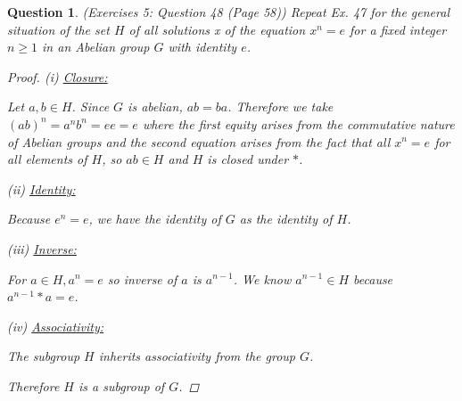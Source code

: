 \documentclass{article}
\newtheorem{ques}{Question}
\begin{document}
\begin{ques} (Exercises 5: Question 48 (Page 58))
	Repeat Ex. 47 for the general situation of the set $H$ of all solutions x of the equation $x^n = e$ for a fixed integer $n \geq 1$ in an Abelian group $G$ with identity $e$. 
	
	\begin{proof}
		(i) \underline{Closure:}
		
		Let $a,b \in H$. Since $G$ is abelian, $ab = ba$. Therefore we take $(ab)^n = a^nb^n = ee = e$ where the first equity arises from the commutative nature of Abelian groups and the second equation arises from the fact that all $x^n = e$ for all elements of $H$, so $ab \in H$ and $H$ is closed under $*$.
		
		(ii) \underline{Identity:}
		
		Because $e^n = e$, we have the identity of $G$ as the identity of $H$.
		
		(iii) \underline{Inverse:}
		
		For $a \in H, a^n = e$ so inverse of $a$ is $a^{n-1}$. We know $a^{n-1} \in H$ because $a^{n-1} * a = e$.
		
		(iv) \underline{Associativity:}
		
		The subgroup $H$ inherits associativity from the group $G$.
	
		Therefore $H$ is a subgroup of $G$.

	\end{proof}
\end{ques}
\end{document}
